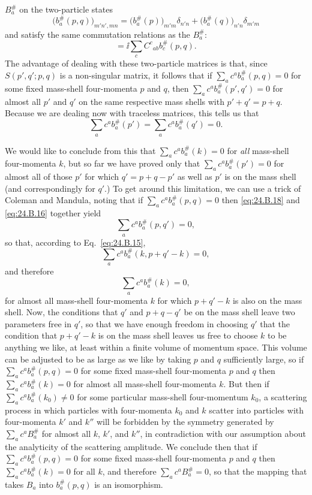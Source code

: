 $B_a^\#$ on the two-particle states
\begin{equation}
 \bigl(b_a^\#(p,q)\bigr)_{m'n',mn}
 =\bigl(b_a^\#(p)\bigr)_{m'm}\delta_{n'n}
 +\bigl(b_a^\#(q)\bigr)_{n'n}\delta_{m'm}
\tag{24.B.16}\label{eq:24.B.16}
\end{equation}
and satisfy the same commutation relations as the $B_a^\#$:
\begin{equation}
 [b_a^\#(p,q),b_b^\#(p,q)]
 =\ii\sum_c C^c{}_{ab}b_c^\#(p,q).
\tag{24.B.17}\label{eq:24.B.17}
\end{equation}
The advantage of dealing with these two-particle matrices is that, since
$S(p',q';p,q)$ is a non-singular matrix, it follows that if
$\sum_a c^a b_a^\#(p,q)=0$ for some fixed mass-shell
four-momenta $p$ and $q$, then
$\sum_a c^a b_a^\#(p',q')=0$ for almost all $p'$ and $q'$ on
the same respective mass shells with $p'+q'=p+q$. Because we are dealing now
with traceless matrices, this tells us that
\begin{equation}
 \sum_a c^a b_a^\#(p')
 =\sum_a c^a b_a^\#(q')=0.
\tag{24.B.18}\label{eq:24.B.18}
\end{equation}

We would like to conclude from this that
$\sum_a c^a b_a^\#(k)=0$ for \emph{all} mass-shell
four-momenta $k$, but so far we have proved only that
$\sum_a c^a b_a^\#(p')=0$ for almost all of those $p'$ for
which $q'=p+q-p'$ as well as $p'$ is on the mass shell (and correspondingly
for $q'$.) To get around this limitation, we can use a trick of Coleman and
Mandula, noting that if $\sum_a c^a b_a^\#(p,q)=0$ then
\eqref{eq:24.B.18} and \eqref{eq:24.B.16} together yield
\[
 \sum_a c^a b_a^\#(p,q')=0,
\]
so that, according to Eq.~\eqref{eq:24.B.15},
\[
 \sum_a c^a b_a^\#(k,p+q'-k)=0,
\]
and therefore
\begin{equation}
 \sum_a c^a b_a^\#(k)=0,
\tag{24.B.19}\label{eq:24.B.19}
\end{equation}
for almost all mass-shell four-momenta $k$ for which $p+q'-k$ is also on the
mass shell. Now, the conditions that $q'$ and $p+q-q'$ be on the mass shell
leave two parameters free in $q'$, so that we have enough freedom in choosing
$q'$ that the condition that $p+q'-k$ is on the mass shell leaves us free to
choose $k$ to be anything we like, at least within a finite volume of momentum
space. This volume can be adjusted to be as large as we like by taking $p$ and
$q$ sufficiently large, so if
$\sum_a c^a b_a^\#(p,q)=0$ for some fixed mass-shell
four-momenta $p$ and $q$ then $\sum_a c^a b_a^\#(k)=0$ for
almost all mass-shell four-momenta $k$. But then if
$\sum_a c^a b_a^\#(k_0)\ne0$ for some particular mass-shell
four-momentum $k_0$, a scattering process in which particles with four-momenta
$k_0$ and $k$ scatter into particles with four-momenta $k'$ and $k''$ will be
forbidden by the symmetry generated by $\sum_a c^a B_a^\#$ for
almost all $k$, $k'$, and $k''$, in contradiction with our assumption about
the analyticity of the scattering amplitude. We conclude then that if
$\sum_a c^a b_a^\#(p,q)=0$ for some fixed mass-shell
four-momenta $p$ and $q$ then $\sum_a c^a b_a^\#(k)=0$ for all
$k$, and therefore $\sum_a c^a B_a^\#=0$, so that the mapping
that takes $B_a$ into $b_a^\#(p,q)$ is an isomorphism.

